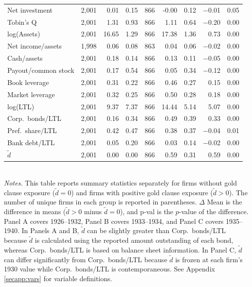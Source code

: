 \begin{table}[p]
\begin{threeparttable}
\begin{tabular}{l rrr rrr rr}
            Net investment & 2,001 & 0.01 & 0.15 & 866 & -0.00 & 0.12 & $-$0.01 & 0.05 \\
            Tobin's Q & 2,001 & 1.31 & 0.93 & 866 & 1.11 & 0.64 & $-$0.20 & 0.00 \\
            log(Assets) & 2,001 & 16.65 & 1.29 & 866 & 17.38 & 1.36 & 0.73 & 0.00 \\
            Net income/assets & 1,998 & 0.06 & 0.08 & 863 & 0.04 & 0.06 & $-$0.02 & 0.00 \\
            Cash/assets & 2,001 & 0.18 & 0.14 & 866 & 0.13 & 0.11 & $-$0.05 & 0.00 \\
            Payout/common stock & 2,001 & 0.17 & 0.54 & 866 & 0.05 & 0.34 & $-$0.12 & 0.00 \\
            Book leverage & 2,001 & 0.31 & 0.22 & 866 & 0.46 & 0.27 & 0.15 & 0.00 \\
            Market leverage & 2,001 & 0.32 & 0.25 & 866 & 0.50 & 0.28 & 0.18 & 0.00 \\
            log(LTL) & 2,001 & 9.37 & 7.37 & 866 & 14.44 & 5.14 & 5.07 & 0.00 \\
            Corp.\ bonds/LTL & 2,001 & 0.16 & 0.34 & 866 & 0.49 & 0.39 & 0.33 & 0.00 \\
            Pref.\ share/LTL & 2,001 & 0.42 & 0.47 & 866 & 0.38 & 0.37 & $-$0.04 & 0.01 \\
            Bank debt/LTL & 2,001 & 0.05 & 0.20 & 866 & 0.03 & 0.14 & $-$0.02 & 0.00 \\
            \ensuremath{\tilde{d}} & 2,001 & 0.00 & 0.00 & 866 & 0.59 & 0.31 & 0.59 & 0.00 \\
            \bottomrule
        \end{tabular}
    \end{threeparttable}\\
    
    \vspace*{3mm} \justifying \noindent
    \scriptsize{\textit{Notes.} This table reports summary statistics separately for firms without gold clause exposure ($\tilde{d} = 0$) and firms with positive gold clause exposure ($\tilde{d} > 0$). The number of unique firms in each group is reported in parentheses. $\Delta$ Mean is the difference in means ($\tilde{d} > 0$ minus $\tilde{d} = 0$), and p-val is the $p$-value of the difference. Panel A covers 1926--1932, Panel B covers 1933--1934, and Panel C covers 1935--1940. In Panels A and B, $\tilde{d}$ can be slightly greater than Corp.\ bonds/LTL because $\tilde{d}$ is calculated using the reported amount outstanding of each bond, whereas Corp.\ bonds/LTL is based on balance sheet information. In Panel C, $\tilde{d}$ can differ significantly from Corp.\ bonds/LTL because $\tilde{d}$ is frozen at each firm's 1930 value while Corp.\ bonds/LTL is contemporaneous. See Appendix \ref{secapp:vars} for variable definitions.}
\end{table}
